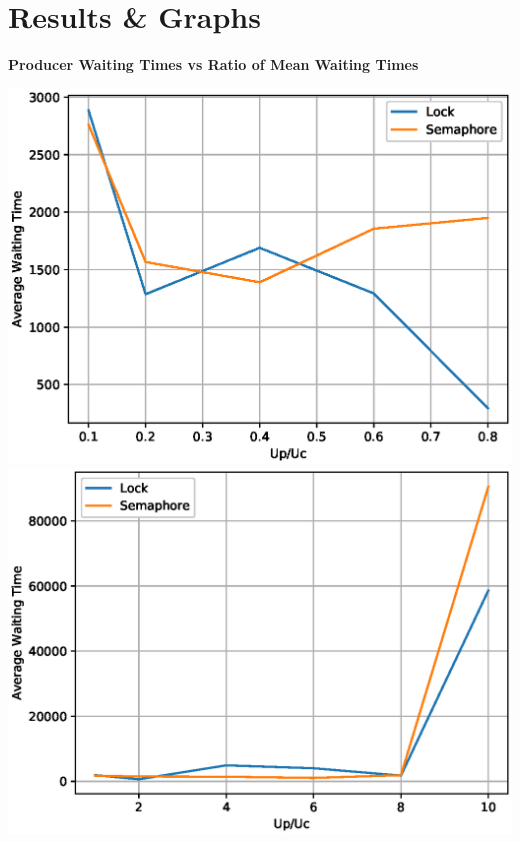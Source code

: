 \documentclass[a4paper,12pt]{report}
\begin{document}
\section{Results \& Graphs}
\begin{center}
\begin{large}
\textbf{Producer Waiting Times vs Ratio of Mean Waiting Times}\\
\end{large}
\includegraphics[scale=0.7]{producerd.eps}
\includegraphics[scale=0.7]{producer.eps}
\end{center}
\newpage
\end{document}
